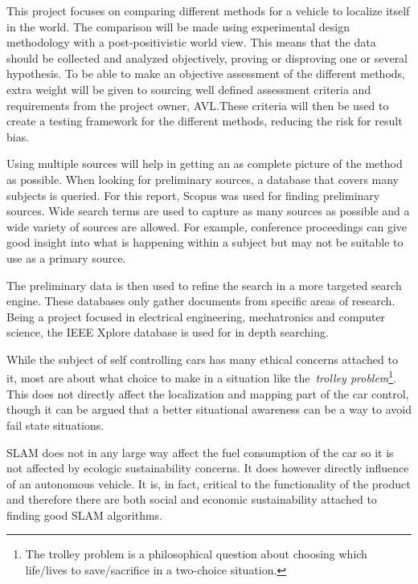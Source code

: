 This project focuses on comparing different methods for a vehicle to localize
itself in the world. The comparison will be made using experimental design
methodology with a post-positivistic world view. This means that the data should
be collected and analyzed objectively, proving or disproving one or several
hypothesis\cite{creswell}. To be able to make an objective assessment of the different methods,
extra weight will be given to sourcing well defined assessment criteria and
requirements from the project owner, AVL.\@ These criteria will then be used to
create a testing framework for the different methods, reducing the risk for
result bias.

Using multiple sources will help in getting an as complete picture of the method
as possible. When looking for preliminary sources, a database that covers many
subjects is queried. For this report, Scopus was used for finding preliminary
sources. Wide search terms are used to capture as many sources as possible and a
wide variety of sources are allowed. For example, conference proceedings can
give good insight into what is happening within a subject but may not be
suitable to use as a primary source. 

The preliminary data is then used to refine the search in a more targeted search
engine. These databases only gather documents from specific areas of research.
Being a project focused in electrical engineering, mechatronics and computer
science, the IEEE Xplore database is used for in depth searching.  

While the subject of self controlling cars has many ethical concerns attached to
it, most are about what choice to make in a situation like the~\textit{trolley
problem}\footnote{The
trolley problem is a philosophical question about choosing which life/lives to
save/sacrifice in a two-choice situation.}. This does not directly
affect the localization and mapping part of the car control, though it can be
argued that a better situational awareness can be a way to avoid fail state
situations. 

SLAM does not in any large way affect the fuel consumption of the car so it is
not affected by ecologic sustainability concerns. It does however directly
influence of an autonomous vehicle. It is, in fact, critical to the
functionality of the product and therefore there are both social and economic
sustainability attached to finding good SLAM algorithms. 
